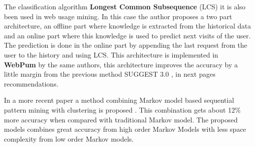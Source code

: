 The classification algorithm \textbf{Longest Common Subsequence} (LCS)
\cite{4631852} it is also been used in web usage mining. In this case the author
proposes a two part architecture, an offline part where knowledge is extracted
from the historical data and an online part where this knowledge is used to
predict next visits of the user. The prediction is done in the online part by
appending the last request from the user to the history and using LCS. This
architecture is implemented in \textbf{WebPum} \cite{Jalali20106201} by the same
authors, this architecture improves the accuracy by a little margin from the
previous method SUGGEST 3.0 \cite{1410804}, in next pages recommendations.

In a more recent paper a method combining Markov model based sequential pattern
mining with clustering is proposed \cite{Anitha_anew}. This combination gets
about 12\% more accuracy when compared with traditional Markov model.
The proposed models combines great accuracy from high order Markov Models with
less space complexity from low order Markov models.


